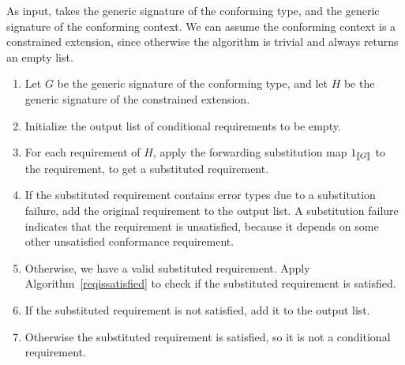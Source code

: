 \documentclass[../generics]{subfiles}
\begin{document}
\begin{algorithm}\label{conditional requirements algorithm}
As input, takes the generic signature of the conforming type, and the generic signature of the conforming context. We can assume the conforming context is a constrained extension, since otherwise the algorithm is trivial and always returns an empty list.
\begin{enumerate}
\item Let $G$ be the generic signature of the conforming type, and let $H$ be the generic signature of the constrained extension.
\item Initialize the output list of conditional requirements to be empty.
\item For each requirement of $H$, apply the forwarding substitution map $1_{[\![G]\!]}$ to the requirement, to get a substituted requirement.
\item If the substituted requirement contains error types due to a substitution failure, add the original requirement to the output list. A substitution failure indicates that the requirement is unsatisfied, because it depends on some other unsatisfied conformance requirement.
\item Otherwise, we have a valid substituted requirement. Apply Algorithm~\ref{reqissatisfied} to check if the substituted requirement is satisfied.
\item If the substituted requirement is not satisfied, add it to the output list.
\item Otherwise the substituted requirement is satisfied, so it is not a conditional requirement.
\end{enumerate}
\end{algorithm}
\end{document}
